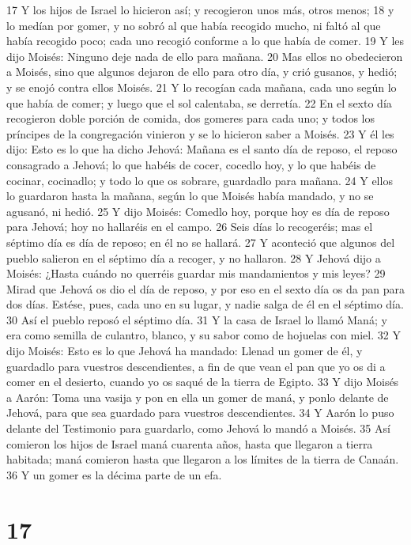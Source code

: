 17 Y los hijos de Israel lo hicieron así; y recogieron unos más, otros menos;
18 y lo medían por gomer, y no sobró al que había recogido mucho, ni faltó al que había recogido poco; cada uno recogió conforme a lo que había de comer.
19 Y les dijo Moisés: Ninguno deje nada de ello para mañana.
20 Mas ellos no obedecieron a Moisés, sino que algunos dejaron de ello para otro día, y crió gusanos, y hedió; y se enojó contra ellos Moisés.
21 Y lo recogían cada mañana, cada uno según lo que había de comer; y luego que el sol calentaba, se derretía.
22 En el sexto día recogieron doble porción de comida, dos gomeres para cada uno; y todos los príncipes de la congregación vinieron y se lo hicieron saber a Moisés.
23 Y él les dijo: Esto es lo que ha dicho Jehová: Mañana es el santo día de reposo, el reposo consagrado a Jehová; lo que habéis de cocer, cocedlo hoy, y lo que habéis de cocinar, cocinadlo; y todo lo que os sobrare, guardadlo para mañana.
24 Y ellos lo guardaron hasta la mañana, según lo que Moisés había mandado, y no se agusanó, ni hedió.
25 Y dijo Moisés: Comedlo hoy, porque hoy es día de reposo para Jehová; hoy no hallaréis en el campo.
26 Seis días lo recogeréis; mas el séptimo día es día de reposo; en él no se hallará.
27 Y aconteció que algunos del pueblo salieron en el séptimo día a recoger, y no hallaron.
28 Y Jehová dijo a Moisés: ¿Hasta cuándo no querréis guardar mis mandamientos y mis leyes?
29 Mirad que Jehová os dio el día de reposo, y por eso en el sexto día os da pan para dos días. Estése, pues, cada uno en su lugar, y nadie salga de él en el séptimo día.
30 Así el pueblo reposó el séptimo día.
31 Y la casa de Israel lo llamó Maná; y era como semilla de culantro, blanco, y su sabor como de hojuelas con miel.
32 Y dijo Moisés: Esto es lo que Jehová ha mandado: Llenad un gomer de él, y guardadlo para vuestros descendientes, a fin de que vean el pan que yo os di a comer en el desierto, cuando yo os saqué de la tierra de Egipto.
33 Y dijo Moisés a Aarón: Toma una vasija y pon en ella un gomer de maná, y ponlo delante de Jehová, para que sea guardado para vuestros descendientes.
34 Y Aarón lo puso delante del Testimonio para guardarlo, como Jehová lo mandó a Moisés.
35 Así comieron los hijos de Israel maná cuarenta años, hasta que llegaron a tierra habitada; maná comieron hasta que llegaron a los límites de la tierra de Canaán.
36 Y un gomer es la décima parte de un efa.

\chapter{17}

